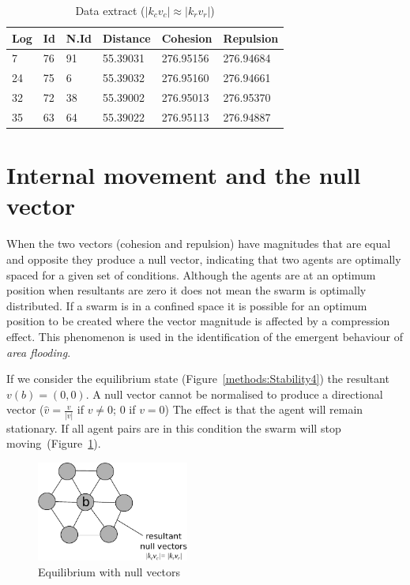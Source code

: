 \documentclass{ieeeaccess}
\begin{document}
\begin{table}[H]
\begin{center}
\begin{tabular}{| l | l | l | l | l | l |}
\hline
Log &	Id &	N.Id &	Distance &	{\color{green}Cohesion} &	{\color{red}Repulsion} 	\\ \hline
7 & 76 &	91 & 55.39031 & {\color{green}276.95156} & {\color{red}276.94684} \\ \hline
24 & 75 & 6 & 55.39032 & {\color{green}276.95160} & {\color{red}276.94661} \\ \hline
32 & 72 & 38 &	55.39002 & {\color{green}276.95013} & {\color{red}276.95370} \\ \hline
35 & 63 & 64 & 55.39022 &	{\color{green}276.95113} &	{\color{red}276.94887} \\
\hline
\end{tabular}\caption{Data extract ($|k_cv_c| \approx |k_rv_r|$)} \label{tab:SampleEquilibrium}
\end{center}
\end{table}

\section{Internal movement and the null vector}\label{metric:StabilityNullVector}
When the two vectors (cohesion and repulsion) have magnitudes that are equal and opposite they produce a null vector, indicating that two agents are optimally spaced for a given set of conditions. Although the agents are at an optimum position when resultants are zero it does not mean the swarm is optimally distributed. If a swarm is in a confined space it is possible for an optimum position to be created where the vector magnitude is affected by a compression effect. This phenomenon is used in the identification of the emergent behaviour of \emph{area flooding}.  

If we consider the equilibrium state (Figure~\ref{methods:Stability4}) the resultant $v(b)=(0,0)$. A null vector cannot be normalised to produce a directional vector ($\hat{v} = \frac{v}{|v|}$ if $v\neq0$; $0$ if $v=0$) The effect is that the agent will remain stationary. If all agent pairs are in this condition the swarm will stop moving~(Figure~\ref{methods:StabilityNullVector}).

\begin{figure}[H]
\begin{center}
\includegraphics[width=5cm]{figures/StabilityNullVector}
\end{center}
\caption{Equilibrium with null vectors} \label{methods:StabilityNullVector}
\end{figure}
\end{document}

